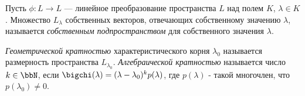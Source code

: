   \begin{defn}
  Пусть $\phi:L\rightarrow L$ --- линейное преобразование пространства $L$ над полем $K$, $\lambda \in K$. Множество $L_\lambda$ собственных векторов, отвечающих собственному значению $\lambda$, называется \textit{собственным подпространством} для собственного значения $\lambda$.
  \end{defn}
  \begin{defn}
  \textit{Геометрической кратностью} характеристического корня $\lambda_0$ называется размерность пространства $L_{\lambda_0}$.
  \textit{Алгебраической кратностью} называется число $k \in \bbN$, если $\bigchi(\lambda)=(\lambda-\lambda_0)^k p(\lambda)$, где $p(\lambda)$ - такой многочлен, что $p(\lambda_0) \neq 0$.
  \end{defn}
  
$ $\\ $ $\\

